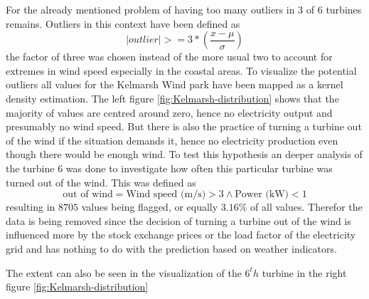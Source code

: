 \documentclass{article}
\begin{document}
For the already mentioned problem of having too many outliers in 3 of 6 turbines remains. Outliers in this context have been defined as
\begin{equation}
    |outlier| >= 3 * \left( \frac{x - \mu}{\sigma} \right)
\end{equation}
the factor of three was chosen instead of the more usual two to account for extremes in wind speed especially in the coastal areas. To visualize the potential outliers all values for the Kelmarsh Wind park have been mapped as a kernel density estimation. The left figure \ref{fig:Kelmarsh-distribution} shows that the majority of values are centred around zero, hence no electricity output and presumably no wind speed. But there is also the practice of turning a turbine out of the wind if the situation demands it, hence no electricity production even though there would be enough wind. To test this hypothesis an deeper analysis of the turbine 6 was done to investigate how often this particular turbine was turned out of the wind. This was defined as 
\begin{equation}
    \text{out of wind} = \text{Wind speed (m/s)} > 3 \land \text{Power (kW)} < 1 
\end{equation}
resulting in $8705$ values being flagged, or equally $3.16 \%$ of all values. Therefor the data is being removed since the decision of turning a turbine out of the wind is influenced more by the stock exchange prices or the load factor of the electricity grid and has nothing to do with the prediction based on weather indicators. \par 
The extent can also be seen in the visualization of the $6^th$ turbine in the right figure \ref{fig:Kelmarsh-distribution}
\end{document}
